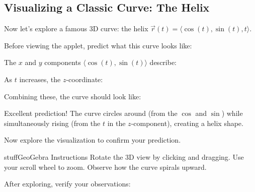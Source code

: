 \documentclass{ximera}
\begin{document}
\subsection*{Visualizing a Classic Curve: The Helix}

Now let's explore a famous 3D curve: the helix $\vec{r}(t)=\langle \cos(t), \sin(t), t\rangle$.

\begin{problem}
Before viewing the applet, predict what this curve looks like:

The $x$ and $y$ components $\langle \cos(t), \sin(t) \rangle$ describe:
\begin{multipleChoice}
\end{multipleChoice}

As $t$ increases, the $z$-coordinate:
\begin{multipleChoice}
\end{multipleChoice}

Combining these, the curve should look like:
\begin{multipleChoice}
\end{multipleChoice}

\begin{feedback}
Excellent prediction! The curve circles around (from the $\cos$ and $\sin$) while simultaneously rising (from the $t$ in the $z$-component), creating a helix shape.
\end{feedback}
\end{problem}

\begin{problem}
Now explore the visualization to confirm your prediction.

\begin{expandable}{stuff}{GeoGebra Instructions}
    Rotate the 3D view by clicking and dragging. Use your scroll wheel to zoom. Observe how the curve spirals upward.
\end{expandable}

\begin{center}
\end{center}

After exploring, verify your observations:
\begin{selectAll}
\end{selectAll}
\end{problem}
\end{document}
